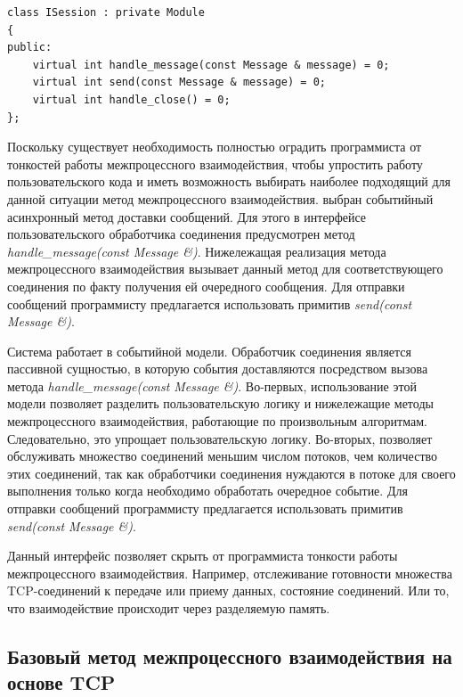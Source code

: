 \begin{lstlisting}[float=!h,caption={Интерфейс пользовательского обработчика соединений на C++},label={chapter31:ServiceHandlerInterface}]
class ISession : private Module
{
public:
	virtual int handle_message(const Message & message) = 0;
	virtual int send(const Message & message) = 0;
	virtual int handle_close() = 0;
};
\end{lstlisting}

Поскольку существует необходимость полностью оградить программиста от тонкостей работы межпроцессного взаимодействия, чтобы упростить работу пользовательского кода и иметь возможность выбирать наиболее подходящий для данной ситуации метод межпроцессного взаимодействия. выбран событийный асинхронный метод доставки сообщений. Для этого в интерфейсе пользовательского обработчика соединения предусмотрен метод \textit{handle\_message(const Message \&)}. Нижележащая реализация метода межпроцессного взаимодействия вызывает данный метод для соответствующего соединения по факту получения ей очередного сообщения. Для отправки сообщений программисту предлагается использовать примитив \textit{send(const Message \&)}.

Система работает в событийной модели. Обработчик соединения является пассивной сущностью, в которую события доставляются посредством вызова метода \textit{handle\_message(const Message \&)}. Во-первых, использование этой модели позволяет разделить пользовательскую логику и нижележащие методы межпроцессного взаимодействия, работающие по произвольным алгоритмам. Следовательно, это упрощает пользовательскую логику. Во-вторых, позволяет обслуживать множество соединений меньшим числом потоков, чем количество этих соединений, так как обработчики соединения нуждаются в потоке для своего выполнения только когда необходимо обработать очередное событие. Для отправки сообщений программисту предлагается использовать примитив \textit{send(const Message \&)}.

Данный интерфейс позволяет скрыть от программиста тонкости работы межпроцессного взаимодействия. Например, отслеживание готовности множества TCP-соединений к передаче или приему данных, состояние соединений. Или то, что взаимодействие происходит через разделяемую память.

\subsection{Базовый метод межпроцессного взаимодействия на основе TCP}\label{chapter31:PureTCP}

